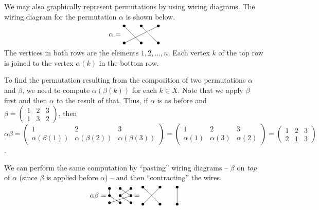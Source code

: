 \documentclass[svgnames]{article}
\theoremstyle{definition}
\theoremstyle{remark}
\newcommand{\newterm}[1]{{\color{alertcolor} #1}}
\begin{document}
\begin{appendices}
We may also graphically represent permutations by using \newterm{wiring diagrams}. The wiring diagram for the permutation $\alpha$ is shown below.
\begin{equation*}
\alpha = \,\vcenter{\xymatrix{
*=0{\bullet} \ar@{-}[dr]	&	*=0{\bullet} \ar@{-}[dr]	&	*=0{\bullet} \ar@{-}[dll]\\
*=0{\bullet}	&	*=0{\bullet}	&	*=0{\bullet}
}}
\end{equation*}
The vertices in both rows are the elements $1, 2, \ldots, n$. Each vertex $k$ of the top row is joined to the vertex $\alpha(k)$ in the bottom row.

To find the permutation resulting from the composition of two permutations $\alpha$ and $\beta$, we need to compute $\alpha(\beta(k))$ for each $k \in X$. Note that we apply $\beta$ first and then $\alpha$ to the result of that. Thus, if $\alpha$ is as before and $\beta = \begin{pmatrix}
1 & 2 & 3\\
1 & 3 & 2
\end{pmatrix}$, then $\alpha\beta = \begin{pmatrix}
1 & 2 & 3\\
\alpha(\beta(1)) & \alpha(\beta(2)) & \alpha(\beta(3))
\end{pmatrix} = \begin{pmatrix}
1 & 2 & 3\\
\alpha(1) & \alpha(3) & \alpha(2)
\end{pmatrix} = \begin{pmatrix}
1 & 2 & 3\\
2 & 1 & 3
\end{pmatrix}$.

We can perform the same computation by ``pasting'' wiring diagrams -- $\beta$ on \emph{top} of $\alpha$ (since $\beta$ is applied before $\alpha$) -- and then ``contracting'' the wires.
\begin{equation*}
\alpha\beta = \,\vcenter{\xymatrix@R=1em@C=1.5em{
*=0{\bullet} \ar@{-}[d]		&	*=0{\bullet} \ar@{-}[dr]	&	*=0{\bullet} \ar@{-}[dl]\\
*=0{\bullet} \ar@{-}[dr]	&	*=0{\bullet} \ar@{-}[dr]	&	*=0{\bullet} \ar@{-}[dll]\\
*=0{\bullet}				&	*=0{\bullet}				&	*=0{\bullet}\\		
}}\, = \,\vcenter{\xymatrix{
*=0{\bullet} \ar@{-}[dr]	&	*=0{\bullet} \ar@{-}[dl]	&	*=0{\bullet} \ar@{-}[d]\\
*=0{\bullet}				&	*=0{\bullet}				&	*=0{\bullet}\\
}}
\end{equation*}


\end{appendices}
\end{document}
